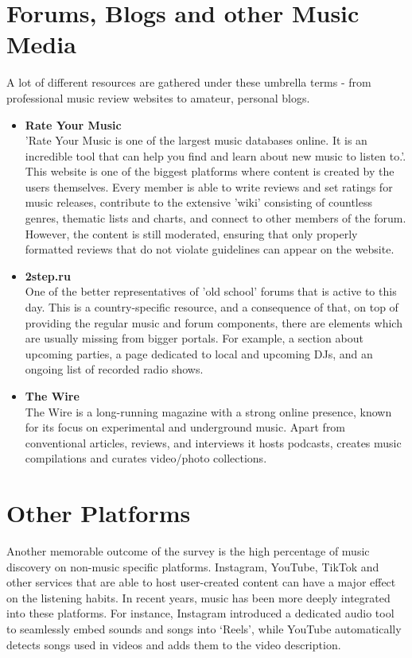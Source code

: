 \section{Forums, Blogs and other Music Media}
A lot of different resources are gathered under these umbrella terms - from professional music review websites to
amateur, personal blogs.

\begin{itemize}
    \item \textbf{Rate Your Music} \\
    'Rate Your Music is one of the largest music databases online. It is an incredible tool that
    can help you find and learn about new music to listen to.'\cite{ryt}.\\
    This website is one of the biggest platforms where
    content is created by the users themselves. Every member is able to write reviews and set ratings for music releases,
    contribute to the extensive 'wiki' consisting of countless genres, thematic lists and charts,
    and connect to other members of the forum. However, the content is still moderated,
    ensuring that only properly formatted reviews that do not violate guidelines can appear on the website.

    \item \textbf{2step.ru} \\
    One of the better representatives of 'old school' forums that is active to this day.
    This is a country-specific resource, and a consequence of that,
    on top of providing the regular music and forum components, there are elements which are usually missing
    from bigger portals. For example, a section about upcoming parties,
    a page dedicated to local and upcoming DJs, and an ongoing list of recorded radio shows.\cite{2step}

    \item \textbf{The Wire} \\
    The Wire is a long-running magazine with a strong online presence,
    known for its focus on experimental and underground music.
    Apart from conventional articles, reviews, and interviews it hosts podcasts, creates music compilations and curates
    video/photo collections.
\end{itemize}


\section{Other Platforms}
Another memorable outcome of the survey is the high percentage of music discovery on non-music specific platforms.
Instagram, YouTube, TikTok and other services that are able to host user-created content can have a major effect on
the listening habits. In recent years, music has been more deeply integrated into these platforms.
For instance, Instagram introduced a dedicated audio tool to seamlessly embed sounds and songs into ‘Reels’\cite{inst_audio},
while YouTube automatically detects songs used in videos and adds them to the video description.


